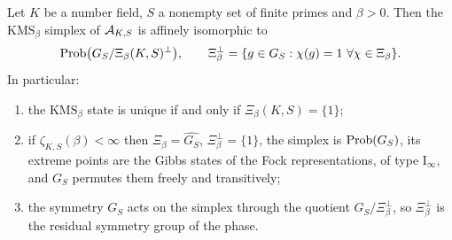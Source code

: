 \begin{theorem}[Classification]\label{Main:thm:main}
Let $K$ be a number field, $S$ a nonempty set of finite primes and $\beta>0$.
Then the $\mathrm{KMS}_\beta$ simplex of $\mathcal{A}_{K,S}$ is affinely isomorphic to
\[
\Prob\bigl(G_S/\Xi_\beta(K,S)^\perp\bigr),\qquad
\Xi_\beta^\perp=\{g\in G_S:\chi(g)=1\ \forall\chi\in\Xi_\beta\}.
\]
In particular:
\begin{enumerate}
\item the $\mathrm{KMS}_\beta$ state is unique if and only if
$\Xi_\beta(K,S)=\{1\}$;
\item if $\zeta_{K,S}(\beta)<\infty$ then $\Xi_\beta=\widehat{G_S}$,
$\Xi_\beta^\perp=\{1\}$, the simplex is $\mathrm{Prob}(G_S)$, its extreme points are the
Gibbs states of the Fock representations, of type $\mathrm I_\infty$, and $G_S$
permutes them freely and transitively;
\item the symmetry $G_S$ acts on the simplex through the quotient
$G_S/\Xi_\beta^\perp$, so $\Xi_\beta^\perp$ is the residual symmetry group of
the phase.
\end{enumerate}
\end{theorem}

